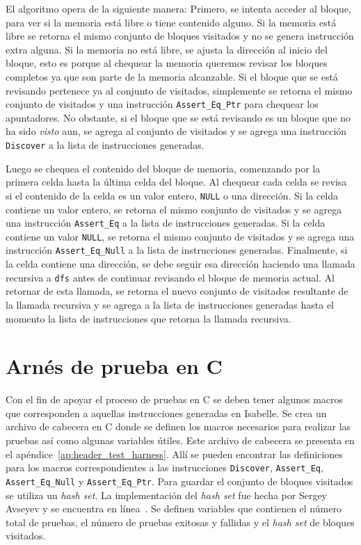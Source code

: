El algoritmo opera de la siguiente manera:
Primero, se intenta acceder al bloque, para ver si la memoria está libre o tiene contenido alguno.
Si la memoria está libre se retorna el mismo conjunto de bloques visitados y no se genera instrucción extra alguna.
Si la memoria no está libre, se ajusta la dirección al inicio del bloque, esto es porque al chequear la memoria queremos revisar los bloques completos ya que son parte de la memoria alcanzable.
Si el bloque que se está revisando pertenece ya al conjunto de visitados, simplemente se retorna el mismo conjunto de visitados y una instrucción \verb|Assert_Eq_Ptr| para chequear los apuntadores.
No obstante, si el bloque que se está revisando es un bloque que no ha sido \textit{visto} aun, se agrega al conjunto de visitados y se agrega una instrucción \verb|Discover| a la lista de instrucciones generadas.

Luego se chequea el contenido del bloque de memoria, comenzando por la primera celda hasta la última celda del bloque.
Al chequear cada celda se revisa si el contenido de la celda es un valor entero, \verb|NULL| o una dirección.
Si la celda contiene un valor entero, se retorna el mismo conjunto de visitados y se agrega una instrucción \verb|Assert_Eq| a la lista de instrucciones generadas.
Si la celda contiene un valor \verb|NULL|, se retorna el mismo conjunto de visitados y se agrega una instrucción \verb|Assert_Eq_Null| a la lista de instrucciones generadas.
Finalmente, si la celda contiene una dirección, se debe seguir esa dirección haciendo una llamada recursiva a \verb|dfs| antes de continuar revisando el bloque de memoria actual.
Al retornar de esta llamada, se retorna el nuevo conjunto de visitados resultante de la llamada recursiva y se agrega a la lista de instrucciones generadas hasta el momento la lista de instrucciones que retorna la llamada recursiva.


\section{Arnés de prueba en C}

Con el fin de apoyar el proceso de pruebas en C se deben tener algunos macros que corresponden a aquellas instrucciones generadas en Isabelle.
Se crea un archivo de cabecera en C donde se definen los macros necesarios para realizar las pruebas así como algunas variables útiles.
Este archivo de cabecera se presenta en el apéndice~\ref{ap:header_test_harness}.
Allí se pueden encontrar las definiciones para los macros correspondientes a las instrucciones \verb|Discover|, \verb|Assert_Eq|, \verb|Assert_Eq_Null| y \verb|Assert_Eq_Ptr|.
Para guardar el conjunto de bloques visitados se utiliza un \textit{hash set}.
La implementación del \textit{hash set} fue hecha por Sergey Avseyev y se encuentra en línea~\cite{hashset}.
Se definen variables que contienen el número total de pruebas, el número de pruebas exitosas y fallidas y el \textit{hash set} de bloques visitados.


